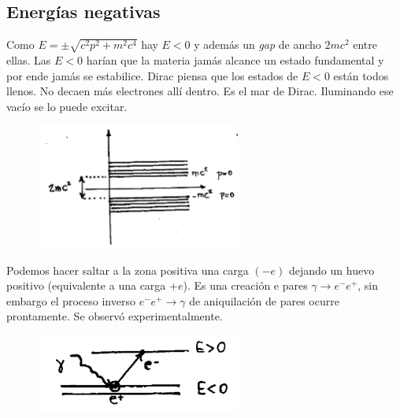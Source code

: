 \documentclass[10pt,oneside]{CBFT_book}
\begin{document}
\subsection{Energías negativas}

Como $E = \pm  \sqrt{ c^2 p^2 + m^2 c^4 } $ hay $E<0$ y además un {\it gap} de ancho $2mc^2$ entre ellas.
Las $E<0$ harían que la materia jamás alcance un estado fundamental y por ende jamás se estabilice.
Dirac piensa que los estados de $E<0$ están todos llenos. No decaen más electrones allí dentro. Es el mar de 
Dirac. Iluminando ese vacío se lo puede excitar.

\begin{figure}[htb]
	\begin{center}
	\includegraphics[width=0.6\textwidth]{images/teo2_13.pdf}
	\end{center}
	\caption{}
\end{figure} 

Podemos hacer saltar a la zona positiva una carga $(-e)$ dejando un huevo positivo (equivalente a una carga 
$+e$). Es una creación e pares $\gamma \to e^-e^+$, sin embargo el proceso inverso $ e^-e^+ \to \gamma$ de 
aniquilación de pares ocurre prontamente.
Se observó experimentalmente.

\begin{figure}[htb]
	\begin{center}
	\includegraphics[width=0.6\textwidth]{images/teo2_14.pdf}
	\end{center}
	\caption{}
\end{figure} 


\end{document}
